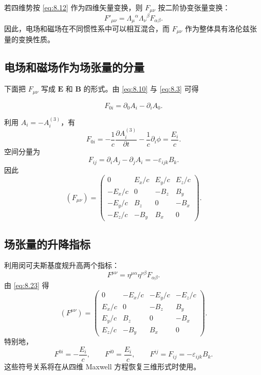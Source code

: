 若四维势按 \eqref{eq:8.12} 作为四维矢量变换，则 $F_{\mu\nu}$ 按二阶协变张量变换：
\begin{equation}
	F'_{\mu\nu}
	=
	\Lambda_{\mu}{}^{\alpha}\Lambda_{\nu}{}^{\beta}F_{\alpha\beta}.
	\label{eq:8.19}
\end{equation}
因此，电场和磁场在不同惯性系中可以相互混合，而 $F_{\mu\nu}$ 作为整体具有洛伦兹张量的变换性质。

\subsection{电场和磁场作为场张量的分量}

下面把 $F_{\mu\nu}$ 写成 $\bm{E}$ 和 $\bm{B}$ 的形式。由 \eqref{eq:8.10} 与 \eqref{eq:8.3} 可得

\[
F_{0i}
=
\partial_{0}A_{i}-\partial_{i}A_{0}.
\]

利用 $A_{i}=-A^{(3)}_{i}$，有
\begin{equation}
	F_{0i}
	=
	-\frac{1}{c}\frac{\partial A^{(3)}_{i}}{\partial t}
	-
	\frac{1}{c}\partial_{i}\phi
	=
	\frac{E_{i}}{c}.
	\label{eq:8.21}
\end{equation}
空间分量为
\begin{equation}
	F_{ij}
	=
	\partial_{i}A_{j}-\partial_{j}A_{i}
	=
	-\varepsilon_{ijk}B_{k}.
	\label{eq:8.22}
\end{equation}
因此
\begin{equation}
	(F_{\mu\nu})
	=
	\begin{pmatrix}
		0 & E_{x}/c & E_{y}/c & E_{z}/c\\
		-E_{x}/c & 0 & -B_{z} & B_{y}\\
		-E_{y}/c & B_{z} & 0 & -B_{x}\\
		-E_{z}/c & -B_{y} & B_{x} & 0
	\end{pmatrix}.
	\label{eq:8.23}
\end{equation}

\subsection{场张量的升降指标}

利用闵可夫斯基度规升高两个指标：
\begin{equation}
	F^{\mu\nu}
	=
	\eta^{\mu\alpha}\eta^{\nu\beta}F_{\alpha\beta}.
	\label{eq:8.24}
\end{equation}
由 \eqref{eq:8.23} 得
\begin{equation}
	(F^{\mu\nu})
	=
	\begin{pmatrix}
		0 & -E_{x}/c & -E_{y}/c & -E_{z}/c\\
		E_{x}/c & 0 & -B_{z} & B_{y}\\
		E_{y}/c & B_{z} & 0 & -B_{x}\\
		E_{z}/c & -B_{y} & B_{x} & 0
	\end{pmatrix}.
	\label{eq:8.25}
\end{equation}
特别地，
\begin{equation}
	F^{0i}=-\frac{E_{i}}{c},
	\qquad
	F^{i0}=\frac{E_{i}}{c},
	\qquad
	F^{ij}=F_{ij}=-\varepsilon_{ijk}B_{k}.
	\label{eq:8.26}
\end{equation}
这些符号关系将在从四维 Maxwell 方程恢复三维形式时使用。

